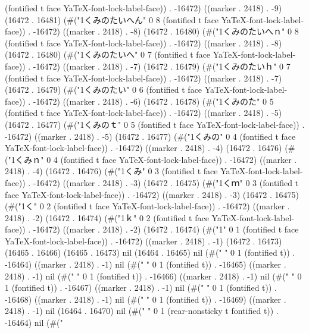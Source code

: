(fontified t face YaTeX-font-lock-label-face)) . -16472) ((marker . 2418) . -9) (16472 . 16481) (#("1くみのたいへん" 0 8 (fontified t face YaTeX-font-lock-label-face)) . -16472) ((marker . 2418) . -8) (16472 . 16480) (#("1くみのたいへｎ" 0 8 (fontified t face YaTeX-font-lock-label-face)) . -16472) ((marker . 2418) . -8) (16472 . 16480) (#("1くみのたいへ" 0 7 (fontified t face YaTeX-font-lock-label-face)) . -16472) ((marker . 2418) . -7) (16472 . 16479) (#("1くみのたいｈ" 0 7 (fontified t face YaTeX-font-lock-label-face)) . -16472) ((marker . 2418) . -7) (16472 . 16479) (#("1くみのたい" 0 6 (fontified t face YaTeX-font-lock-label-face)) . -16472) ((marker . 2418) . -6) (16472 . 16478) (#("1くみのた" 0 5 (fontified t face YaTeX-font-lock-label-face)) . -16472) ((marker . 2418) . -5) (16472 . 16477) (#("1くみのｔ" 0 5 (fontified t face YaTeX-font-lock-label-face)) . -16472) ((marker . 2418) . -5) (16472 . 16477) (#("1くみの" 0 4 (fontified t face YaTeX-font-lock-label-face)) . -16472) ((marker . 2418) . -4) (16472 . 16476) (#("1くみｎ" 0 4 (fontified t face YaTeX-font-lock-label-face)) . -16472) ((marker . 2418) . -4) (16472 . 16476) (#("1くみ" 0 3 (fontified t face YaTeX-font-lock-label-face)) . -16472) ((marker . 2418) . -3) (16472 . 16475) (#("1くｍ" 0 3 (fontified t face YaTeX-font-lock-label-face)) . -16472) ((marker . 2418) . -3) (16472 . 16475) (#("1く" 0 2 (fontified t face YaTeX-font-lock-label-face)) . -16472) ((marker . 2418) . -2) (16472 . 16474) (#("1ｋ" 0 2 (fontified t face YaTeX-font-lock-label-face)) . -16472) ((marker . 2418) . -2) (16472 . 16474) (#("1" 0 1 (fontified t face YaTeX-font-lock-label-face)) . -16472) ((marker . 2418) . -1) (16472 . 16473) (16465 . 16466) (16465 . 16473) nil (16464 . 16465) nil (#("
" 0 1 (fontified t)) . -16464) ((marker . 2418) . -1) nil (#("	" 0 1 (fontified t)) . -16465) ((marker . 2418) . -1) nil (#("	" 0 1 (fontified t)) . -16466) ((marker . 2418) . -1) nil (#(" " 0 1 (fontified t)) . -16467) ((marker . 2418) . -1) nil (#(" " 0 1 (fontified t)) . -16468) ((marker . 2418) . -1) nil (#(" " 0 1 (fontified t)) . -16469) ((marker . 2418) . -1) nil (16464 . 16470) nil (#("
" 0 1 (rear-nonsticky t fontified t)) . -16464) nil (#("
